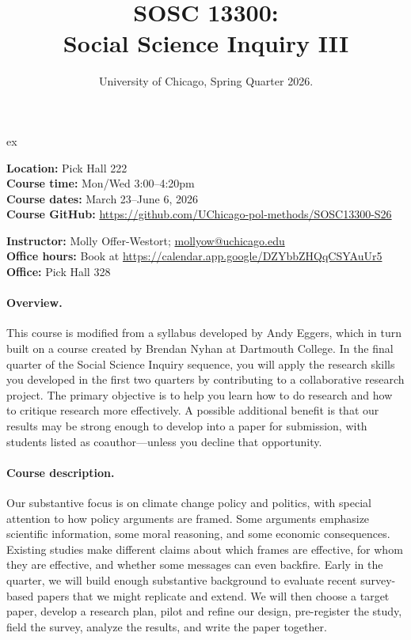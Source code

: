 \documentclass[letterpaper, 12pt, parskip=full, DIV=10]{scrartcl}
\title{SOSC 13300: \\ Social Science Inquiry III}
\subtitle{University of Chicago, Spring Quarter 2026.}
\begin{document}
\maketitle

 ex

\textbf{Location:} Pick Hall 222\\
\textbf{Course time:} Mon/Wed 3:00--4:20pm\\
\textbf{Course dates:} March 23--June 6, 2026\\
\textbf{Course GitHub:} \url{https://github.com/UChicago-pol-methods/SOSC13300-S26}

\textbf{Instructor:} Molly Offer-Westort; \href{mailto:mollyow@uchicago.edu}{mollyow@uchicago.edu}\\
\textbf{Office hours:} Book at \url{https://calendar.app.google/DZYbbZHQqCSYAuUr5}\\
\textbf{Office:} Pick Hall 328

\paragraph{Overview.}
This course is modified from a syllabus developed by Andy Eggers, which in turn built on a course created by Brendan Nyhan at Dartmouth College. In the final quarter of the Social Science Inquiry sequence, you will apply the research skills you developed in the first two quarters by contributing to a collaborative research project. The primary objective is to help you learn how to do research and how to critique research more effectively. A possible additional benefit is that our results may be strong enough to develop into a paper for submission, with students listed as coauthor---unless you decline that opportunity.

\paragraph{Course description.}
Our substantive focus is on climate change policy and politics, with special attention to how policy arguments are framed. Some arguments emphasize scientific information, some moral reasoning, and some economic consequences. Existing studies make different claims about which frames are effective, for whom they are effective, and whether some messages can even backfire. Early in the quarter, we will build enough substantive background to evaluate recent survey-based papers that we might replicate and extend. We will then choose a target paper, develop a research plan, pilot and refine our design, pre-register the study, field the survey, analyze the results, and write the paper together.
\end{document}
